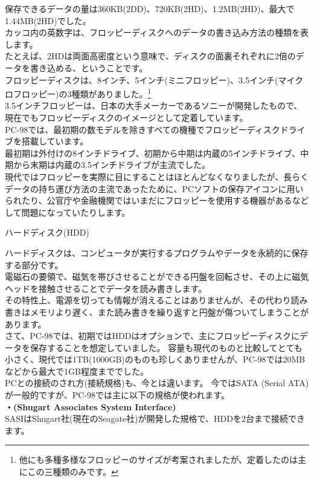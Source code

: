 \documentclass[b5paper,9pt,platex,dvipdfmx]{jsarticle}
\begin{document}
\begin{multicols}{3}
\begin{enumerate}
  保存できるデータの量は360KB(2DD)、720KB(2HD)、1.2MB(2HD)、最大で1.44MB(2HD)でした。\\
  カッコ内の英数字は、フロッピーディスクへのデータの書き込み方法の種類を表します。\\
  たとえば、2HDは両面高密度という意味で、ディスクの面裏それぞれに2倍のデータを書き込める、ということです。\\
  フロッピーディスクは、8インチ、5インチ(ミニフロッピー)、3.5インチ(マイクロフロッピー)の3種類がありました。\footnote{他にも多種多様なフロッピーのサイズが考案されましたが、定着したのは主にこの三種類のみです。}\\
  3.5インチフロッピーは、日本の大手メーカーであるソニーが開発したもので、現在でもフロッピーディスクのイメージとして定着しています。\\
  PC-98では、最初期の数モデルを除きすべての機種でフロッピーディスクドライブを搭載しています。\\
  最初期は外付けの8インチドライブ、初期から中期は内蔵の5インチドライブ、中期から末期は内蔵の3.5インチドライブが主流でした。\\
  現代ではフロッピーを実際に目にすることはほとんどなくなりましたが、長らくデータの持ち運び方法の主流であったために、PCソフトの保存アイコンに用いられたり、公官庁や金融機関ではいまだにフロッピーを使用する機器があるなどして問題になっていたりします。
  {\bf  \item ハードディスク(HDD)\\}
  ハードディスクは、コンピュータが実行するプログラムやデータを永続的に保存する部分です。\\
  電磁石の要領で、磁気を帯びさせることができる円盤を回転させ、その上に磁気ヘッドを接触させることでデータを読み書きします。\\
  その特性上、電源を切っても情報が消えることはありませんが、その代わり読み書きはメモリより遅く、また読み書きを繰り返すと円盤が傷ついてしまうことがあります。\\
  さて、PC-98では、初期ではHDDはオプションで、主にフロッピーディスクにデータを保存することを想定していました。
  容量も現代のものと比較してとても小さく、現代では1TB(1000GB)のものも珍しくありませんが、PC-98では20MBなどから最大で1GB程度まででした。\\
  PCとの接続のされ方(接続規格)も、今とは違います。
  今ではSATA (Serial ATA)が一般的ですが、PC-98では主に以下の規格が使われます。\\
  {\bf・(Shugart Associates System Interface)\\}
  SASIはShugart社(現在のSeagate社)が開発した規格で、HDDを2台まで接続できます。\\

\end{enumerate}
\end{multicols}
\end{document}
